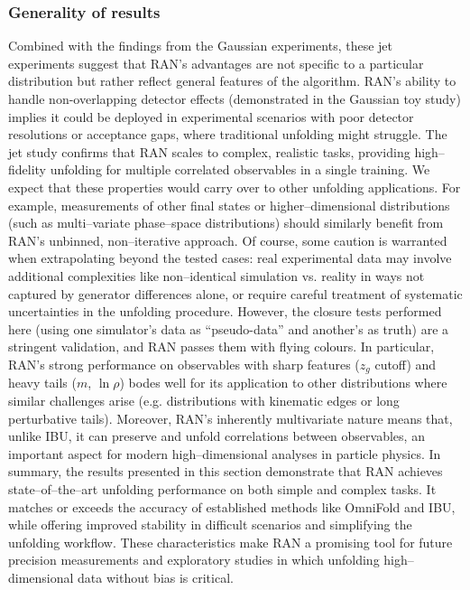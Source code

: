     \subsubsection{Generality of results}
    Combined with the findings from the Gaussian experiments, these jet experiments suggest that RAN’s advantages are not specific to a particular distribution but rather reflect general features of the algorithm.
    RAN’s ability to handle non-overlapping detector effects (demonstrated in the Gaussian toy study) implies it could be deployed in experimental scenarios with poor detector resolutions or acceptance gaps, where traditional unfolding might struggle.
    The jet study confirms that RAN scales to complex, realistic tasks, providing high--fidelity unfolding for multiple correlated observables in a single training.
    We expect that these properties would carry over to other unfolding applications.
    For example, measurements of other final states or higher--dimensional distributions (such as multi--variate phase--space distributions) should similarly benefit from RAN’s unbinned, non--iterative approach.
    Of course, some caution is warranted when extrapolating beyond the tested cases: real experimental data may involve additional complexities like non--identical simulation vs. reality in ways not captured by generator differences alone, or require careful treatment of systematic uncertainties in the unfolding procedure.
    However, the closure tests performed here (using one simulator’s data as “pseudo-data” and another’s as truth) are a stringent validation, and RAN passes them with flying colours.
    In particular, RAN’s strong performance on observables with sharp features ($z_g$ cutoff) and heavy tails ($m$, $\ln\rho$) bodes well for its application to other distributions where similar challenges arise (e.g. distributions with kinematic edges or long perturbative tails).
    Moreover, RAN’s inherently multivariate nature means that, unlike IBU, it can preserve and unfold correlations between observables, an important aspect for modern high--dimensional analyses in particle physics.
    In summary, the results presented in this section demonstrate that RAN achieves state--of--the--art unfolding performance on both simple and complex tasks.
    It matches or exceeds the accuracy of established methods like OmniFold and IBU, while offering improved stability in difficult scenarios and simplifying the unfolding workflow.
    These characteristics make RAN a promising tool for future precision measurements and exploratory studies in which unfolding high--dimensional data without bias is critical.